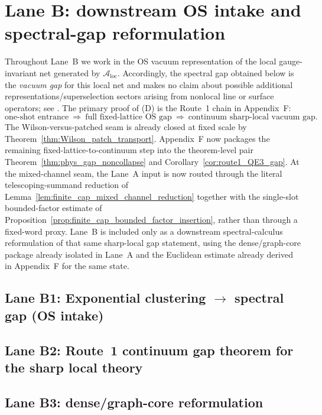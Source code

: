 \section{Lane B: downstream OS intake and spectral-gap reformulation}
\label{sec:mass_gap_intake}

Throughout Lane~B we work in the OS vacuum representation of the local gauge-invariant net generated by
$\mathcal A_{\mathrm{loc}}$.
Accordingly, the spectral gap obtained below is the \emph{vacuum gap} for this local net and makes no claim about
possible additional representations/superselection sectors arising from nonlocal line or surface operators;
see .
The primary proof of (D) is the Route~1 chain in Appendix~F:
\[
\text{one-shot entrance}\ \Longrightarrow\ \text{full fixed-lattice OS gap}\ \Longrightarrow\ \text{continuum sharp-local vacuum gap}.
\]
The Wilson-versus-patched seam is already closed at fixed scale by Theorem~\ref{thm:Wilson_patch_transport}.
Appendix~F now packages the remaining fixed-lattice-to-continuum step into the theorem-level pair Theorem~\ref{thm:phys_gap_noncollapse} and Corollary~\ref{cor:route1_QE3_gap}.
At the mixed-channel seam, the Lane~A input is now routed through the literal telescoping-summand reduction of Lemma~\ref{lem:finite_cap_mixed_channel_reduction} together with the single-slot bounded-factor estimate of Proposition~\ref{prop:finite_cap_bounded_factor_insertion}, rather than through a fixed-word proxy.
Lane~B is included only as a downstream spectral-calculus reformulation of that same sharp-local gap statement, using the dense/graph-core package already isolated in Lane~A and the Euclidean estimate already derived in Appendix~F for the same state.

\subsection{Lane B1: Exponential clustering \texorpdfstring{$\to$}{to} spectral gap (OS intake)}



\subsection{Lane B2: Route~1 continuum gap theorem for the sharp local theory}


\subsection{Lane B3: dense/graph-core reformulation}

